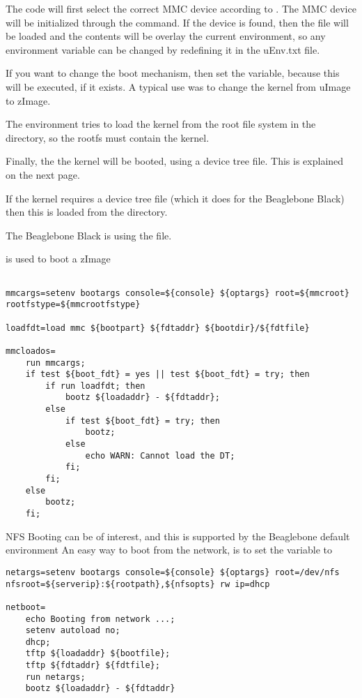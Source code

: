 The  code will first select the correct MMC device according to .
The MMC device will be initialized through the  command.
If the device is found, then the file  will be loaded and the contents
will be overlay the current environment, so any environment variable can be 
changed by redefining it in the uEnv.txt file.

If you want to change the boot mechanism, then set the  variable,
because this will be executed, if it exists.
A typical use was to change the kernel from uImage to zImage.

The environment tries to load the kernel from the root file system
in the  directory, so the rootfs must contain the kernel.

Finally, the the kernel will be booted, using a device tree file.
This is explained on the next page.

\clearpage

If the kernel requires a device tree file (which it does for the Beaglebone Black)
then this is loaded from the  directory.

The Beaglebone Black is using the  file.

 is used to boot a zImage

\begin{lstlisting}

mmcargs=setenv bootargs console=${console} ${optargs} root=${mmcroot} rootfstype=${mmcrootfstype}

loadfdt=load mmc ${bootpart} ${fdtaddr} ${bootdir}/${fdtfile}

mmcloados=
	run mmcargs;
	if test ${boot_fdt} = yes || test ${boot_fdt} = try; then 
		if run loadfdt; then 
			bootz ${loadaddr} - ${fdtaddr}; 
		else 
			if test ${boot_fdt} = try; then 
				bootz; 
			else
				echo WARN: Cannot load the DT; 
			fi; 
		fi; 
	else 
		bootz; 
	fi;
\end{lstlisting}

NFS Booting can be of interest, and this is supported by the Beaglebone default environment
An easy way to boot from the network, is to set the  variable to 

\begin{lstlisting}
netargs=setenv bootargs console=${console} ${optargs} root=/dev/nfs nfsroot=${serverip}:${rootpath},${nfsopts} rw ip=dhcp

netboot=
	echo Booting from network ...;
	setenv autoload no; 
	dhcp; 
	tftp ${loadaddr} ${bootfile}; 
	tftp ${fdtaddr} ${fdtfile}; 
	run netargs; 
	bootz ${loadaddr} - ${fdtaddr}
\end{lstlisting}

